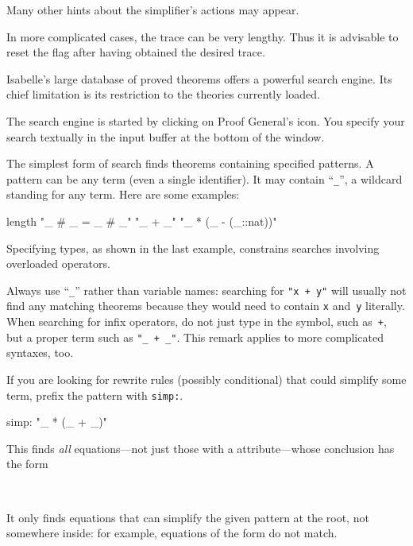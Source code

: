 \begin{isabellebody}
\begin{isamarkuptext}
Many other hints about the simplifier's actions may appear.

In more complicated cases, the trace can be very lengthy.  Thus it is
advisable to reset the  flag after having
obtained the desired trace.%
\end{isamarkuptext}%
\isamarkuptrue%
%
\isamarkuptrue%
%
\begin{isamarkuptext}%
Isabelle's large database of proved theorems 
offers a powerful search engine. Its chief limitation is
its restriction to the theories currently loaded.

\begin{pgnote}
The search engine is started by clicking on Proof General's  icon.
You specify your search textually in the input buffer at the bottom
of the window.
\end{pgnote}

The simplest form of search finds theorems containing specified
patterns.  A pattern can be any term (even
a single identifier).  It may contain ``\texttt{\_}'', a wildcard standing
for any term. Here are some
examples:
\begin{ttbox}
length
"_ # _ = _ # _"
"_ + _"
"_ * (_ - (_::nat))"
\end{ttbox}
Specifying types, as shown in the last example, 
constrains searches involving overloaded operators.

\begin{warn}
Always use ``\texttt{\_}'' rather than variable names: searching for
\texttt{"x + y"} will usually not find any matching theorems
because they would need to contain \texttt{x} and~\texttt{y} literally.
When searching for infix operators, do not just type in the symbol,
such as~\texttt{+}, but a proper term such as \texttt{"_ + _"}.
This remark applies to more complicated syntaxes, too.
\end{warn}

If you are looking for rewrite rules (possibly conditional) that could
simplify some term, prefix the pattern with \texttt{simp:}.
\begin{ttbox}
simp: "_ * (_ + _)"
\end{ttbox}
This finds \emph{all} equations---not just those with a  attribute---whose conclusion has the form
\begin{isabelle}%
\ \ \ \ \ {\isacharunderscore}\ {\isacharasterisk}\ {\isacharparenleft}{\isacharunderscore}\ {\isacharplus}\ {\isacharunderscore}{\isacharparenright}\ {\isacharequal}\ {\isasymdots}%
\end{isabelle}
It only finds equations that can simplify the given pattern
at the root, not somewhere inside: for example, equations of the form
\isa{{\isacharunderscore}\ {\isacharplus}\ {\isacharunderscore}\ {\isacharequal}\ {\isasymdots}} do not match.


\end{isamarkuptext}
\end{isabellebody}
